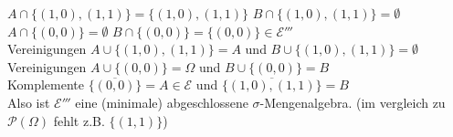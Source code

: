 \documentclass{article}
\begin{document}
	$A\cap \{(1,0),(1,1)\} = \{(1,0),(1,1)\}$ $B\cap \{(1,0),(1,1)\} = \emptyset$\\
	$A\cap \{(0,0)\} = \emptyset$ $B\cap \{(0,0)\} = \{(0,0)\}\in\mathcal{E}'''$\\
	Vereinigungen $A\cup\{(1,0),(1,1)\}=A$ und $B\cup\{(1,0),(1,1)\}=\emptyset$\\
	Vereinigungen $A\cup\{(0,0)\}=\Omega$ und $B\cup\{(0,0)\}=B$\\
	Komplemente $\overline{\{(0,0)\}} = A\in\mathcal{E}$ und $\overline{\{(1,0),(1,1)\}}=B$\\
	Also ist $\mathcal{E}'''$ eine (minimale) abgeschlossene $\sigma$-Mengenalgebra. (im vergleich zu $\mathcal{P}(\Omega)$ fehlt z.B. $\{(1,1)\}$)
\end{document}
